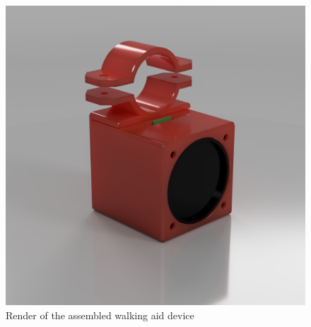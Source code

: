 \begin{figure}[H]
	\centering
	\captionsetup{width=1.0\linewidth}


	\includegraphics[width=0.75\linewidth]{graphics/cad/walkingaid_1.png}

	\caption[Walking Aid Device]{Render of the assembled walking aid device}

	\label{fig:walkingaid_1}

\end{figure}